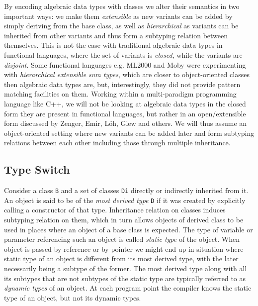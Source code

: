 \documentclass[preprint]{sigplanconf}
\makeatletter
\DeclareRobustCommand{\code}[1]{{\lstinline[breaklines=false,escapechar=@]{#1}}}
\makeatother
\begin{document}
By encoding algebraic data types with classes we alter their semantics in two 
important ways: we make them \emph{extensible} as new variants can be added by 
simply deriving from the base class, as well as \emph{hierarchical} as variants 
can be inherited from other variants and thus form a subtyping relation between 
themselves\cite{Glew99}. This is not the case with traditional algebraic data 
types in functional languages, where the set of variants is \emph{closed}, while 
the variants are \emph{disjoint}. Some functional languages e.g. 
ML2000\cite{ML2000} and Moby\cite{Moby} were experimenting with 
\emph{hierarchical extensible sum types}, which are closer to object-oriented 
classes then algebraic data types are, but, interestingly, they did not provide 
pattern matching facilities on them. Working within a multi-paradigm  
programming language like C++, we will not be looking at algebraic data types in
the closed form they are present in functional languages, but rather in an 
open/extensible form discussed by Zenger\cite{Zenger:2001}, Emir\cite{EmirThesis}, 
L\"oh\cite{LohHinze2006}, Glew\cite{Glew99} and others. We will thus 
assume an object-oriented setting where new variants can be added later and form
subtyping relations between each other including those through multiple 
inheritance.

\subsection{Type Switch}

Consider a class \code{B} and a set of classes \code{Di} directly or indirectly 
inherited from it. An object is said to be of the \emph{most derived type} 
\code{D} if it was created by explicitly calling a constructor of that type.
Inheritance relation on classes induces subtyping relation on them, which in 
turn allows objects of derived class to be used in places where an object of a 
base class is expected. The type of variable or parameter referencing such an
object is called \emph{static type} of the object. When object is passed by 
reference or by pointer we might end up in situation where static type of an 
object is different from its most derived type, with the later necessarily 
being a subtype of the former. The most derived type along with all its subtypes 
that are not subtypes of the static type are typically referred to as 
\emph{dynamic types} of an object. At each program point the compiler knows the 
static type of an object, but not its dynamic types.
\end{document}
